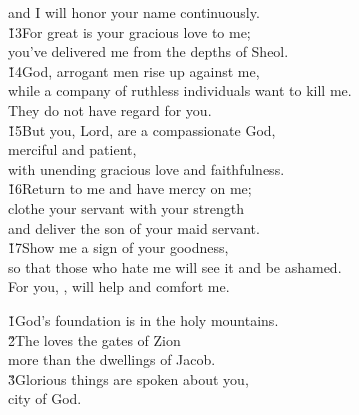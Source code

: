 \begin{poetry}
\poemll    and I will honor your name continuously. \\
\poeml \v{13}For great is your gracious love to me; \\
\poemll    you've delivered me from the depths of Sheol. \\
\poeml \v{14}God, arrogant men rise up against me, \\
\poemll    while a company of ruthless individuals want to kill me. \\
\poemlll       They do not have regard for you. \\
\poeml \v{15}But you, Lord, are a compassionate God, \\
\poemll    merciful and patient, \\
\poemlll       with unending gracious love and faithfulness. \\
\poeml \v{16}Return to me and have mercy on me; \\
\poemll    clothe your servant with your strength \\
\poemlll       and deliver the son of your maid servant. \\
\poeml \v{17}Show me a sign of your goodness, \\
\poemll    so that those who hate me will see it and be ashamed. \\
\poemlll       For you, , will help and comfort me.
\end{poetry}

\begin{poetry}
\poeml \v{1}God's foundation is in the holy mountains. \\
\poeml \v{2}The  loves the gates of Zion \\
\poemll    more than the dwellings of Jacob. \\
\poeml \v{3}Glorious things are spoken about you, \\
\poemll    city of God.
\end{poetry}

